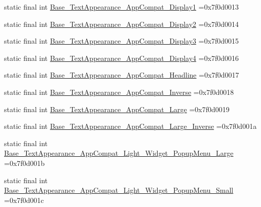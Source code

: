 \begin{DoxyCompactItemize}
\item 
static final int \mbox{\hyperlink{classcom_1_1example_1_1trainawearapplication_1_1_r_1_1style_a8a3ffecdab149f20979682482ef414f7}{Base\+\_\+\+Text\+Appearance\+\_\+\+App\+Compat\+\_\+\+Display1}} =0x7f0d0013
\item 
static final int \mbox{\hyperlink{classcom_1_1example_1_1trainawearapplication_1_1_r_1_1style_aea88a9578b1c3bd12345f36de11ec1ba}{Base\+\_\+\+Text\+Appearance\+\_\+\+App\+Compat\+\_\+\+Display2}} =0x7f0d0014
\item 
static final int \mbox{\hyperlink{classcom_1_1example_1_1trainawearapplication_1_1_r_1_1style_a32cdc97aee7e52a4b72e67cdfd0e1d7a}{Base\+\_\+\+Text\+Appearance\+\_\+\+App\+Compat\+\_\+\+Display3}} =0x7f0d0015
\item 
static final int \mbox{\hyperlink{classcom_1_1example_1_1trainawearapplication_1_1_r_1_1style_aea36b8c0b34076df876dc7ea42579ba5}{Base\+\_\+\+Text\+Appearance\+\_\+\+App\+Compat\+\_\+\+Display4}} =0x7f0d0016
\item 
static final int \mbox{\hyperlink{classcom_1_1example_1_1trainawearapplication_1_1_r_1_1style_a827bdb0ef204571262343c901f6f6230}{Base\+\_\+\+Text\+Appearance\+\_\+\+App\+Compat\+\_\+\+Headline}} =0x7f0d0017
\item 
static final int \mbox{\hyperlink{classcom_1_1example_1_1trainawearapplication_1_1_r_1_1style_a458c1f9ed98f0859bd4f5b45df9e2031}{Base\+\_\+\+Text\+Appearance\+\_\+\+App\+Compat\+\_\+\+Inverse}} =0x7f0d0018
\item 
static final int \mbox{\hyperlink{classcom_1_1example_1_1trainawearapplication_1_1_r_1_1style_a90e87aa88bda9debaa703c63adb8863d}{Base\+\_\+\+Text\+Appearance\+\_\+\+App\+Compat\+\_\+\+Large}} =0x7f0d0019
\item 
static final int \mbox{\hyperlink{classcom_1_1example_1_1trainawearapplication_1_1_r_1_1style_ad74145ecb49b8e00ab67888ff39ece47}{Base\+\_\+\+Text\+Appearance\+\_\+\+App\+Compat\+\_\+\+Large\+\_\+\+Inverse}} =0x7f0d001a
\item 
static final int \mbox{\hyperlink{classcom_1_1example_1_1trainawearapplication_1_1_r_1_1style_a957246d9ae440a347cb676115654151c}{Base\+\_\+\+Text\+Appearance\+\_\+\+App\+Compat\+\_\+\+Light\+\_\+\+Widget\+\_\+\+Popup\+Menu\+\_\+\+Large}} =0x7f0d001b
\item 
static final int \mbox{\hyperlink{classcom_1_1example_1_1trainawearapplication_1_1_r_1_1style_a3ad55c15408a29a7fb3cca05ad76f849}{Base\+\_\+\+Text\+Appearance\+\_\+\+App\+Compat\+\_\+\+Light\+\_\+\+Widget\+\_\+\+Popup\+Menu\+\_\+\+Small}} =0x7f0d001c

\end{DoxyCompactItemize}
